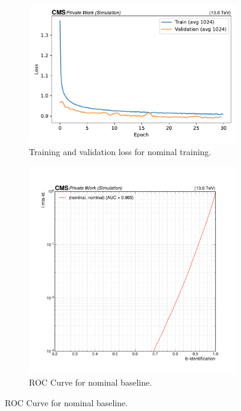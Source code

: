 \begin{figure}[htbp]
  \centering
  \begin{subfigure}[t]{0.59\textwidth}
    \includegraphics[width=\linewidth]{media/output/Nominal Training_loss_validation.pdf}
    \caption{Training and validation loss for nominal training.}
    \label{fig:nominal_training}
  \end{subfigure}\hfill
  \begin{subfigure}[t]{0.41\textwidth}
    \includegraphics[width=\linewidth]{media/output/roc_bvsl_nominal_nominal.pdf}
    \caption{ROC Curve for nominal baseline.}
    \label{fig:nominal_roc}
  \end{subfigure}\hfill
\end{figure}

